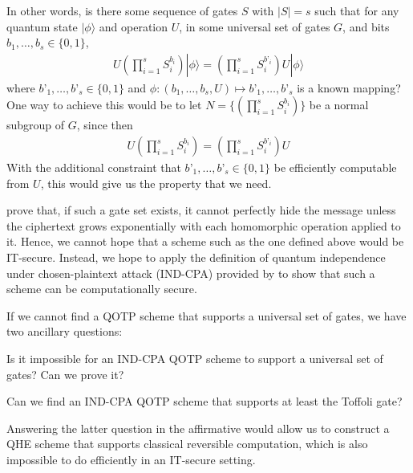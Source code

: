 \documentclass{article}
\newcommand{\ket}[1]{| #1 \rangle}
\begin{document}
In other words, is there some sequence of gates $S$ with $|S| = s$ such that for
any quantum state $\ket\phi$ and operation $U$, in some universal set of gates
$G$, and bits $b_1,\dots,b_s \in \{0,1\}$,
\begin{align}
U (\prod_{i=1}^s S_i^{b_i}) \ket\phi = (\prod_{i=1}^s S_i^{b’_i}) U \ket\phi
\end{align}
where $b’_1,\dots,b’_s \in \{0,1\}$ and $\phi : (b_1,\dots,b_s, U) \mapsto
b’_1,\dots,b’_s$ is a known mapping? One way to achieve this would be to let $N
= \{(\prod_{i=1}^s S_i^{b_i})\}$ be a normal subgroup of $G$, since then
\begin{align}
U (\prod_{i=1}^s S_i^{b_i}) = (\prod_{i=1}^s S_i^{b’_i}) U
\end{align}
With the additional constraint that $b’_1,\dots,b’_s \in \{0,1\}$ be efficiently
computable from $U$, this would give us the property that we need.

\citet{yu2014} prove that, if such a gate set exists, it cannot perfectly hide
the message unless the ciphertext grows exponentially with each homomorphic
operation applied to it. Hence, we cannot hope that a scheme such as the one
defined above would be IT-secure. Instead, we hope to apply the definition of
quantum independence under chosen-plaintext attack (IND-CPA) provided by
\citet{alagic2016} to show that such a scheme can be computationally secure.

If we cannot find a QOTP scheme that supports a universal set of gates, we have
two ancillary questions:
\begin{compactenum}
\item
Is it impossible for an IND-CPA QOTP scheme to support a universal set of gates?
Can we prove it?
\item
Can we find an IND-CPA QOTP scheme that supports at least the Toffoli gate?
\end{compactenum}
Answering the latter question in the affirmative would allow us to construct a
QHE scheme that supports classical reversible computation, which is also
impossible to do efficiently in an IT-secure setting.



\end{document}
